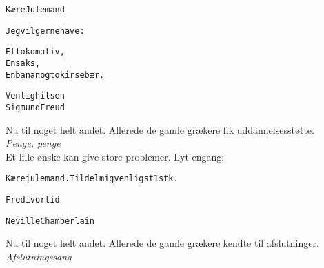 \documentclass[a4paper,11pt]{article}
\begin{document}
\noindent
\begin{alltt}
{\rm
K\ae{}re Julemand

Jeg vil gerne have :

        Et lokomotiv,
        En saks,
        En banan og to kirseb\ae{}r.

                            Venlig hilsen
                            Sigmund Freud
}
\end{alltt}
Nu til noget helt andet. Allerede de gamle gr\ae{}kere fik uddannelsesst\o{}tte. \\
{\em Penge, penge} \\
Et lille \o{}nske kan give store problemer. Lyt engang: \\
\begin{alltt}
{\rm
K\ae{}re julemand. Tildel mig venligst 1 stk.

Fred i vor tid

                             Neville Chamberlain
}
\end{alltt}
Nu til noget helt andet. Allerede de gamle gr\ae{}kere kendte til afslutninger. \\
{\em Afslutningssang}
\end{document}
